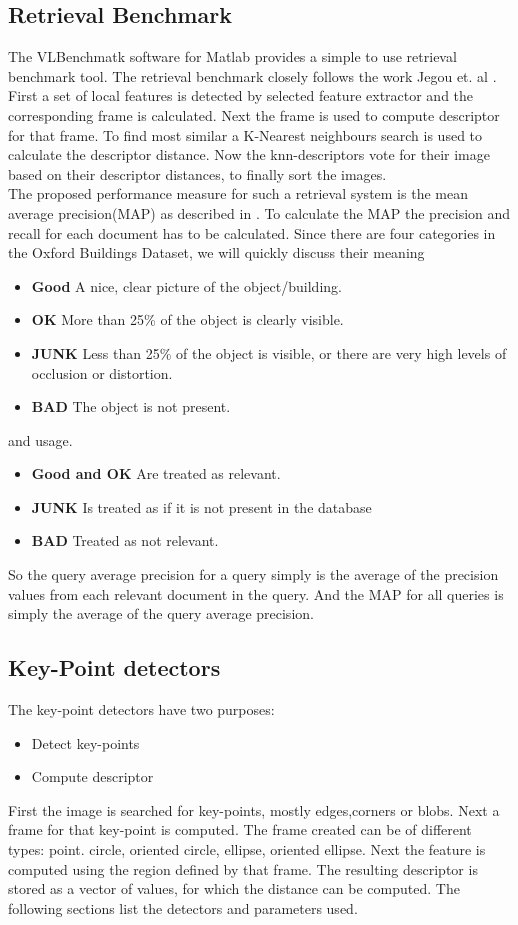 \documentclass[10pt,a4paper]{article}
\begin{document}
\subsection{Retrieval Benchmark}
The VLBenchmatk software for Matlab provides a simple to use retrieval benchmark tool. The retrieval benchmark closely follows the work Jegou et. al \cite{inria}. First a set of local features is detected by selected feature extractor and the corresponding  frame is calculated. Next the frame is used to compute descriptor for that frame. To find most similar a K-Nearest neighbours search is used to calculate the descriptor distance. Now the knn-descriptors vote for their image based on their descriptor distances, to finally sort the images.\\
The proposed performance measure for such a retrieval system is the mean average precision(MAP) as described in \cite{philbin}. To calculate the MAP the precision and recall for each document has to be calculated. Since there are four categories in the Oxford Buildings Dataset, we will quickly discuss their meaning
\begin{itemize}
	\item \textbf{Good}  A nice, clear picture of the object/building.
	\item \textbf{OK} More than 25\% of the object is clearly visible. 
	\item \textbf{JUNK} Less than 25\% of the object is visible, or there are very high levels of occlusion or distortion. 
	\item \textbf{BAD} The object is not present. 
\end{itemize}
and usage.
\begin{itemize}
	\item \textbf{Good and OK} Are treated as relevant.
	\item \textbf{JUNK} Is treated as if it is not present in the database
	\item \textbf{BAD} Treated as not relevant.
\end{itemize}
So the query average precision for a query simply is the average of the precision values from each relevant document in the query. And the MAP for all queries is simply the average of the query average precision.

\subsection{Key-Point detectors}
The key-point detectors have two purposes:
\begin{itemize}
	\item Detect key-points
	\item Compute descriptor
\end{itemize}
First the image is searched for key-points, mostly edges,corners or blobs. Next a frame for that key-point  is computed. The frame created can be of different types: point. circle, oriented circle, ellipse, oriented ellipse. Next the feature is computed using the region defined by that frame. The resulting descriptor is stored as a vector of values, for which the distance can be computed. The following sections list the detectors and parameters used.
\end{document}
